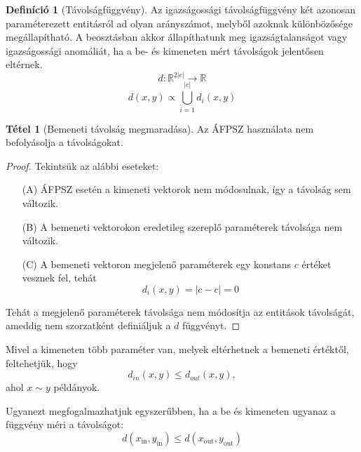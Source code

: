 \documentclass[twocolumn]{article}
\theoremstyle{definition}
\newtheorem{definition}{Definíció}[section]
\newtheorem{theorem}{Tétel}[section]
\newcommand{\subin}[1]{ {#1}_{\text{in}} }
\newcommand{\subout}[1]{ {#1}_{\text{out}} }
\begin{document}
    \begin{definition}[Távolságfüggvény]
        Az igazságossági távolságfüggvény két azonosan paraméterezett entitásról ad olyan arányszámot, melyből azoknak különbözősége megállapítható. A beosztásban akkor állapíthatunk meg igazságtalanságot vagy igazságossági anomáliát, ha a be- és kimeneten mért távolságok jelentősen eltérnek.
        \begin{equation}
            d: \mathbb{R}^{2|e|} \to \mathbb{R}
        \end{equation}
        \begin{equation}
            d(x, y) \propto \bigcup_{i=1}^{|e|} d_i(x, y)
        \end{equation}
    \end{definition}
    
    \begin{theorem}[Bemeneti távolság megmaradása]
        Az ÁFPSZ használata nem befolyásolja a távolságokat.
        \begin{proof} Tekintsük az alábbi eseteket:
            \begin{itemize} 
                \item[(A)] ÁFPSZ esetén a kimeneti vektorok nem módosulnak, így a távolság sem változik.
                \item[(B)] A bemeneti vektorokon eredetileg szereplő paraméterek távolsága nem változik.
                \item[(C)] A bemeneti vektoron megjelenő paraméterek egy konstans $c$ értéket vesznek fel, tehát
                \begin{equation}
                    d_i(x, y) = |c-c| = 0
                \end{equation}
            \end{itemize}
            Tehát a megjelenő paraméterek távolsága nem módosítja az entitások távolságát, ameddig nem szorzatként definiáljuk a $d$ függvényt.
        \end{proof}
    \end{theorem}
    
    Mivel a kimeneten több paraméter van, melyek eltérhetnek a bemeneti értéktől, feltehetjük, hogy
    $$ d_{in}(x, y) \leq d_{out}(x, y), $$
    ahol $ x \sim y $ példányok.
    
    Ugyanezt megfogalmazhatjuk egyszerűbben, ha a be és kimeneten ugyanaz a függvény méri a távolságot:
    \begin{equation}
        d(\subin{x}, \subin{y}) \leq d(\subout{x}, \subout{y})
    \end{equation}
    
\end{document}
